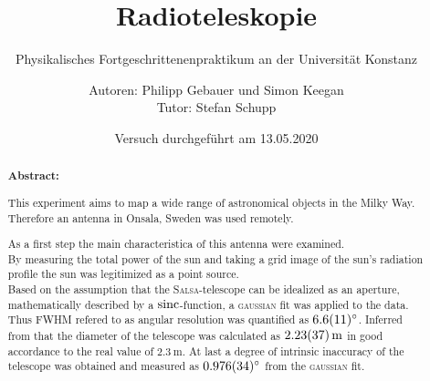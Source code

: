 \title{Radioteleskopie}
\subtitle{Physikalisches Fortgeschrittenenpraktikum an der Universität Konstanz}
\author{Autoren: Philipp Gebauer und Simon Keegan \\ \large{Tutor: Stefan Schupp}}
\date{Versuch durchgeführt am 13.05.2020}
\maketitle
\vspace{2.5 cm}
\begin{abstract}
    \vspace{1cm}
    \noindent \textbf{Abstract:}
    \begin{singlespace}
    This experiment aims to map a wide range of astronomical objects in the Milky Way. Therefore an antenna in Onsala, Sweden was used remotely.

    As a first step the main characteristica of this antenna were examined.\\
    By measuring the total power of the sun and taking a grid image of the sun's radiation profile the sun was legitimized as a point source. \\
    Based on the assumption that the \textsc{Salsa}-telescope can be idealized as an aperture, mathematically described by a $\operatorname{sinc}$-function, a \textsc{gaussian} fit was applied to the data. Thus FWHM refered to as angular resolution was quantified as $\SI{6.6 \pm 1.1}{\degree}$. Inferred from that the diameter of the telescope was calculated as $\SI{2.23 \pm 0.37}{\metre}$ in good accordance to the real value of $\SI{2.3}{\metre}$. At last a degree of intrinsic inaccuracy of the telescope was obtained and measured as $\SI{0.976 \pm 0.034}{\degree}$ from the \textsc{gaussian} fit.
    \end{singlespace}
\end{abstract}
\thispagestyle{empty}
\newpage